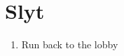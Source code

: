 \chapter{Slyt}

\begin{enumerate}
	\item Run back to the lobby
\end{enumerate}
\begin{equip}
\begin{itemize}
\optimize{\penelo, \ashe}
\end{itemize}
\end{equip}
\begin{liscense}
\begin{itemize}
	\end{itemize}
\end{liscense}

